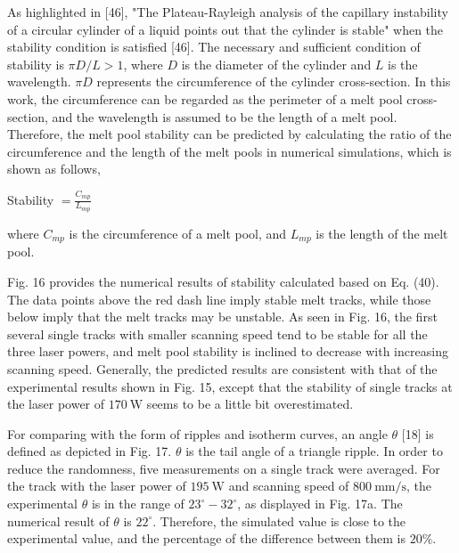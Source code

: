 \documentclass[10pt]{article}
\begin{document}
As highlighted in [46], "The Plateau-Rayleigh analysis of the capillary instability of a circular cylinder of a liquid points out that the cylinder is stable" when the stability condition is satisfied [46]. The necessary and sufficient condition of stability is $\pi D / L>1$, where $D$ is the diameter of the cylinder and $L$ is the wavelength. $\pi D$ represents the circumference of the cylinder cross-section. In this work, the circumference can be regarded as the perimeter of a melt pool cross-section, and the wavelength is assumed to be the length of a melt pool. Therefore, the melt pool stability can be predicted by calculating the ratio of the circumference and the length of the melt pools in numerical simulations, which is shown as follows,

Stability $=\frac{C_{m p}}{L_{m p}}$

where $C_{m p}$ is the circumference of a melt pool, and $L_{m p}$ is the length of the melt pool.

Fig. 16 provides the numerical results of stability calculated based on Eq. (40). The data points above the red dash line imply stable melt tracks, while those below imply that the melt tracks may be unstable. As seen in Fig. 16, the first several single tracks with smaller scanning speed tend to be stable for all the three laser powers, and melt pool stability is inclined to decrease with increasing scanning speed. Generally, the predicted results are consistent with that of the experimental results shown in Fig. 15, except that the stability of single tracks at the laser power of $170 \mathrm{~W}$ seems to be a little bit overestimated.

For comparing with the form of ripples and isotherm curves, an angle $\theta$ [18] is defined as depicted in Fig. 17. $\theta$ is the tail angle of a triangle ripple. In order to reduce the randomness, five measurements on a single track were averaged. For the track with the laser power of $195 \mathrm{~W}$ and scanning speed of $800 \mathrm{~mm} / \mathrm{s}$, the experimental $\theta$ is in the range of $23^{\circ}-32^{\circ}$, as displayed in Fig. 17a. The numerical result of $\theta$ is $22^{\circ}$. Therefore, the simulated value is close to the experimental value, and the percentage of the difference between them is $20 \%$.
\end{document}

